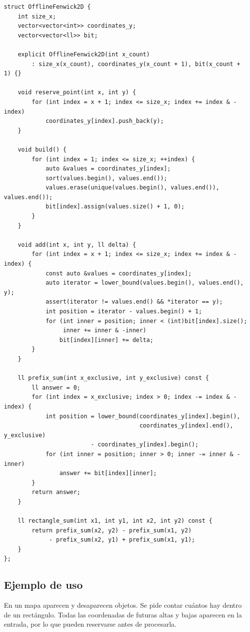 \begin{lstlisting}[style=cpp]
struct OfflineFenwick2D {
    int size_x;
    vector<vector<int>> coordinates_y;
    vector<vector<ll>> bit;

    explicit OfflineFenwick2D(int x_count)
        : size_x(x_count), coordinates_y(x_count + 1), bit(x_count + 1) {}

    void reserve_point(int x, int y) {
        for (int index = x + 1; index <= size_x; index += index & -index)
            coordinates_y[index].push_back(y);
    }

    void build() {
        for (int index = 1; index <= size_x; ++index) {
            auto &values = coordinates_y[index];
            sort(values.begin(), values.end());
            values.erase(unique(values.begin(), values.end()), values.end());
            bit[index].assign(values.size() + 1, 0);
        }
    }

    void add(int x, int y, ll delta) {
        for (int index = x + 1; index <= size_x; index += index & -index) {
            const auto &values = coordinates_y[index];
            auto iterator = lower_bound(values.begin(), values.end(), y);
            assert(iterator != values.end() && *iterator == y);
            int position = iterator - values.begin() + 1;
            for (int inner = position; inner < (int)bit[index].size();
                 inner += inner & -inner)
                bit[index][inner] += delta;
        }
    }

    ll prefix_sum(int x_exclusive, int y_exclusive) const {
        ll answer = 0;
        for (int index = x_exclusive; index > 0; index -= index & -index) {
            int position = lower_bound(coordinates_y[index].begin(),
                                       coordinates_y[index].end(), y_exclusive)
                         - coordinates_y[index].begin();
            for (int inner = position; inner > 0; inner -= inner & -inner)
                answer += bit[index][inner];
        }
        return answer;
    }

    ll rectangle_sum(int x1, int y1, int x2, int y2) const {
        return prefix_sum(x2, y2) - prefix_sum(x1, y2)
             - prefix_sum(x2, y1) + prefix_sum(x1, y1);
    }
};
\end{lstlisting}

\subsection{Ejemplo de uso}

En un mapa aparecen y desaparecen objetos. Se pide contar cu\'antos hay dentro
de un rect\'angulo. Todas las coordenadas de futuras altas y bajas aparecen en
la entrada, por lo que pueden reservarse antes de procesarla.

